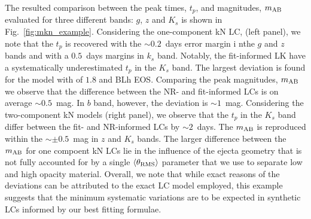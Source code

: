 The resulted comparison between the peak times, $t_p$, and magnitudes, $m_{\rm AB}$ 
evaluated for three different bands: $g$, $z$ and $K_s$ 
is shown in Fig.~\ref{fig:mkn_example}.
Considering the one-component \ac{kN} \ac{LC}, (left panel), we note that the $t_p$ is 
recovered with the ${\sim}0.2$~days error margin i nthe $g$ and $z$ bands and with a 
$0.5$~days margins in $k_s$ band. Notably, the fit-informed \ac{LK} have a systematically
underestimated $t_p$ in the $K_s$ band. 
The largest deviation is found for the model with \mr{} of $1.8$ and BLh \ac{EOS}.
Comparing the peak magnitudes, $m_{\rm AB}$ we observe that the difference 
between the \ac{NR}- and fit-informed \acp{LC} is on average ${\sim}0.5$~mag. 
In $b$ band, however, the deviation is ${\sim}1$~mag.
Considering the two-component \ac{kN} models (right panel), we observe that the 
$t_p$ in the $K_s$ band differ between the fit- and \ac{NR}-informed \acp{LC} by 
${\sim}2$~days. The $m_{\rm AB}$ is reproduced within the ${\sim}\pm 0.5$~mag in $z$ 
and $K_s$ bands.
The larger difference between the $m_{\rm AB}$ for one compoent \ac{kN} \acp{LC} lie 
in the influence of the ejecta geometry that is not fully accounted for by a single 
$\langle\theta_{\rm RMS}\rangle$ parameter that we use to separate low and high opacity material. 
Overall, we note that while exact reasons of the deviations can be attributed to 
the exact \ac{LC} model employed, this example suggests that the minimum systematic 
variations are to be expected in synthetic \acp{LC} informed by our best fitting formulae.


